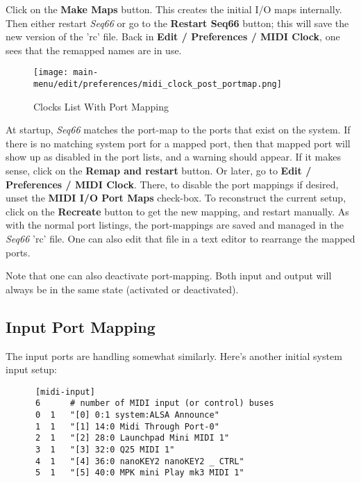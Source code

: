    Click on the \textbf{Make Maps} button.
   This creates the initial I/O maps internally.
   Then either restart \textsl{Seq66} or go to the \textbf{Restart Seq66}
   button; this will save the new version of the 'rc' file.
   Back in \textbf{Edit / Preferences / MIDI Clock},
   one sees that the remapped names are in use.

\begin{figure}[H]
   \centering 
   \texttt{[image: main-menu/edit/preferences/midi\_clock\_post\_portmap.png]}
   \caption{Clocks List With Port Mapping}
   \label{fig:clocks_list_with_port_mapping}
\end{figure}


   At startup, \textsl{Seq66} matches the port-map to the ports that exist on
   the system.  If there is no matching system port for a mapped port, then
   that mapped port will show up as disabled in the port lists,
   and a warning should appear.
   If it makes sense, click on the \textbf{Remap and restart} button.
   Or later, go to \textbf{Edit / Preferences / MIDI Clock}.
   There, to disable the port mappings if desired, unset the
   \textbf{MIDI I/O Port Maps} check-box.
   To reconstruct the current setup, click on the \textbf{Recreate} button to
   get the new mapping, and restart manually.
   As with the normal port listings, the port-mappings are saved and
   managed in the \textsl{Seq66} 'rc' file.
   One can also edit that file in a text editor to
   rearrange the mapped ports.

   Note that one can also deactivate port-mapping. Both input and output
   will always be in the same state (activated or deactivated).

\subsection{Input Port Mapping}
\label{subsec:input_port_mapping}

   The input ports are handling somewhat similarly.  Here's another
   initial system input setup:

   \begin{verbatim}
      [midi-input]
      6      # number of MIDI input (or control) buses
      0  1   "[0] 0:1 system:ALSA Announce"
      1  1   "[1] 14:0 Midi Through Port-0"
      2  1   "[2] 28:0 Launchpad Mini MIDI 1"
      3  1   "[3] 32:0 Q25 MIDI 1"
      4  1   "[4] 36:0 nanoKEY2 nanoKEY2 _ CTRL"
      5  1   "[5] 40:0 MPK mini Play mk3 MIDI 1"
   \end{verbatim}

